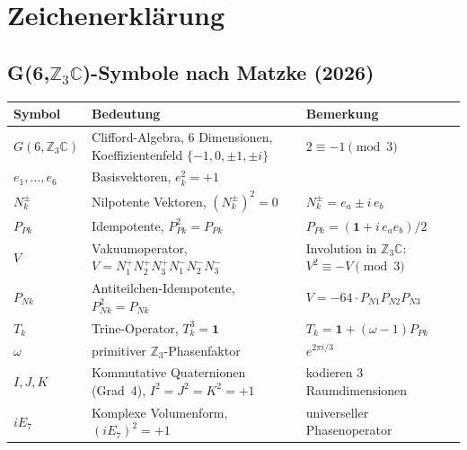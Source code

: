 %

\section*{Zeichenerklärung}

\subsection*{G(6,$\mathbb{Z}_3\mathbb{C}$)-Symbole nach Matzke (2026)}

\begin{center}
\begin{tabular}{lll}
\toprule
Symbol & Bedeutung & Bemerkung \\
\midrule
$G(6,\mathbb{Z}_3\mathbb{C})$ & Clifford-Algebra, 6 Dimensionen,
  Koeffizientenfeld $\{-1,0,\pm1,\pm i\}$ & $2\equiv-1\pmod{3}$ \\
$e_1,\ldots,e_6$ & Basisvektoren, $e_k^2 = +1$ & \\
$N_k^{\pm}$ & Nilpotente Vektoren, $(N_k^{\pm})^2 = 0$ &
  $N_k^{\pm} = e_a \pm i\,e_b$ \\
$P_{Pk}$ & Idempotente, $P_{Pk}^2 = P_{Pk}$ &
  $P_{Pk} = (\mathbf{1}+i\,e_a e_b)/2$ \\
$V$ & Vakuumoperator, $V = N_1^+N_2^+N_3^+N_1^-N_2^-N_3^-$ &
  Involution in $\mathbb{Z}_3\mathbb{C}$: $V^2 \equiv -V \pmod{3}$ \\
$P_{Nk}$ & Antiteilchen-Idempotente, $P_{Nk}^2 = P_{Nk}$ &
  $V = -64\cdot P_{N1}P_{N2}P_{N3}$ \\
$T_k$ & Trine-Operator, $T_k^3 = \mathbf{1}$ &
  $T_k = \mathbf{1}+(\omega-1)P_{Pk}$ \\
$\omega$ & primitiver $\mathbb{Z}_3$-Phasenfaktor &
  $e^{2\pi i/3}$ \\
$I,J,K$ & Kommutative Quaternionen (Grad~4), $I^2=J^2=K^2=+1$ &
  kodieren 3 Raumdimensionen \\
$iE_7$ & Komplexe Volumenform, $(iE_7)^2=+1$ & universeller Phasenoperator \\
\bottomrule
\end{tabular}
\end{center}

